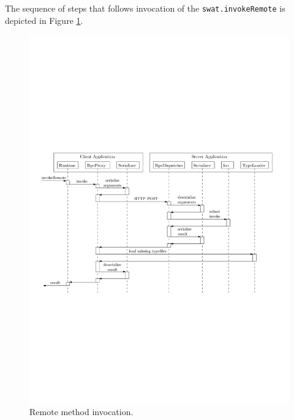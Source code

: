 \documentclass[12pt,a4paper]{report}
\begin{document}
The sequence of steps that follows invocation of the \texttt{swat.invokeRemote} is depicted in Figure \ref{Rpc}.

\begin{figure}[ht]
  \centering
	\includegraphics[width=\linewidth,height=\textheight,keepaspectratio]{img/Rpc.pdf}
	\caption{Remote method invocation.}
	\label{Rpc}
\end{figure}
\end{document}
